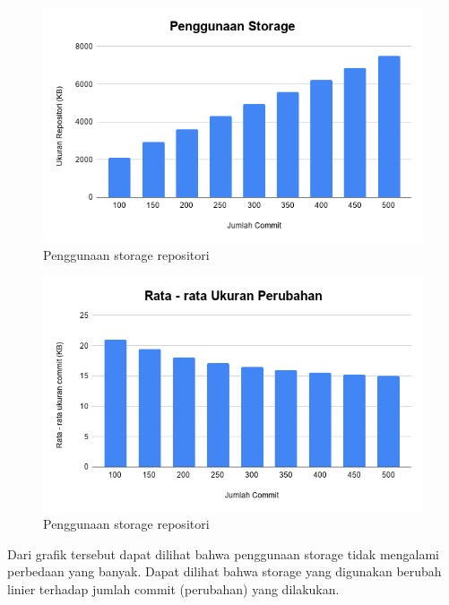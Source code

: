     	\begin{figure}[H]
    	\centering
    	\includegraphics[width=\textwidth]{Images/C-5/Penggunaan-Storage.png}
    	\caption{Penggunaan storage repositori}
    	\label{ukuranRepo}
    	\end{figure}
    
    	\begin{figure}[H]
	    	\centering
	    	\includegraphics[width=\textwidth]{Images/C-5/Rata-rata-Ukuran-Perubahan.png}
	    	\caption{Penggunaan storage repositori}
	    	\label{Rata-rataperubahan}
	    \end{figure}
    
    \indent Dari grafik tersebut dapat dilihat bahwa penggunaan storage tidak mengalami perbedaan yang banyak. Dapat dilihat bahwa storage yang digunakan berubah linier terhadap jumlah commit (perubahan) yang dilakukan.
    
    
    	